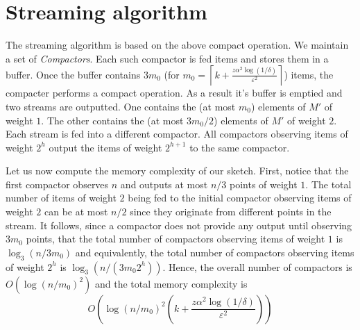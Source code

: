 \documentclass[11pt]{article}
\newcommand{\ceil}[1]{\left \lceil #1 \right \rceil}
\newcommand{\eps}{\varepsilon}
\newcommand{\note}[1]{\textbf{\textcolor{red}{#1}}}
\newcommand{\cost}{\text{COST}}
\newcommand{\topt}{\widetilde{\text{OPT}}}
\newcommand{\N}{{\cal N}}
\begin{document}
%
%

\section{Streaming algorithm}
The streaming algorithm is based on the above compact operation. We maintain a set of \emph{Compactors}. Each such compactor is fed items and stores them in a buffer. Once the buffer contains $3m_0$ (for $m_0 = \ceil{k+\frac{ z \alpha^2 \log(1/\delta)}{\eps^2}}$) items, the compacter performs a compact operation. As a result it's buffer is emptied and two streams are outputted. One contains the (at most $m_0$) elements of $M'$ of weight $1$. The other contains the (at most $3m_0/2$) elements of $M'$ of weight $2$. Each stream is fed into a different compactor. All compactors observing items of weight $2^h$ output the items of weight $2^{h+1}$ to the same compactor.

Let us now compute the memory complexity of our sketch. First, notice that the first compactor observes $n$ and outputs at most $n/3$ points of weight $1$. The total number of items of weight $2$ being fed to the initial compactor observing items of weight $2$ can be at most $n/2$ since they originate from different points in the stream. It follows, since a compactor does not provide any output until observing $3m_0$ points, that the total number of compactors observing items of weight $1$ is $\log_3(n/3m_0)$ and equivalently, the total number of compactors observing items of weight $2^h$ is $\log_3(n/(3m_0 2^h))$. Hence, the overall number of compactors is
$O(\log(n/m_0)^2)$ and the total memory complexity is
$$ O\left( \log(n/m_0)^2  \left( k+\frac{ z \alpha^2 \log(1/\delta)}{\eps^2} \right) \right) $$
\end{document}
